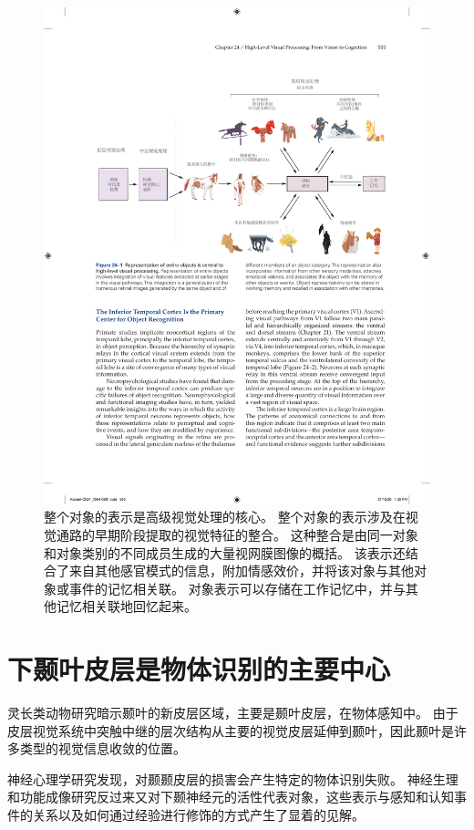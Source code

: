 \begin{figure}[htbp]
	\centering
	\includegraphics[width=0.9\linewidth]{chap24/fig_24_1}
	\caption{整个对象的表示是高级视觉处理的核心。 整个对象的表示涉及在视觉通路的早期阶段提取的视觉特征的整合。 这种整合是由同一对象和对象类别的不同成员生成的大量视网膜图像的概括。 该表示还结合了来自其他感官模式的信息，附加情感效价，并将该对象与其他对象或事件的记忆相关联。 对象表示可以存储在工作记忆中，并与其他记忆相关联地回忆起来。}
	\label{fig:24_1}
\end{figure}



\section{下颞叶皮层是物体识别的主要中心}

灵长类动物研究暗示颞叶的新皮层区域，主要是颞叶皮层，在物体感知中。
由于皮层视觉系统中突触中继的层次结构从主要的视觉皮层延伸到颞叶，因此颞叶是许多类型的视觉信息收敛的位置。


神经心理学研究发现，对颞颞皮层的损害会产生特定的物体识别失败。
神经生理和功能成像研究反过来又对下颞神经元的活性代表对象，这些表示与感知和认知事件的关系以及如何通过经验进行修饰的方式产生了显着的见解。


